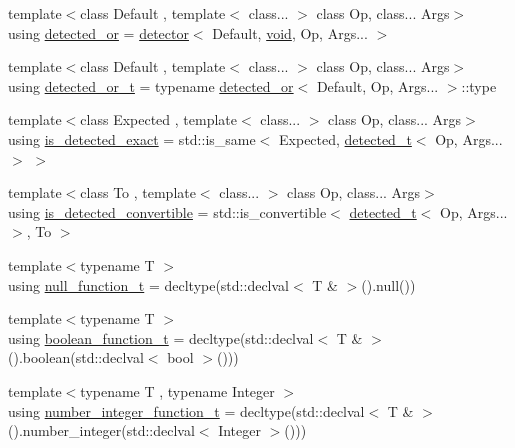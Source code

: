 \begin{DoxyCompactItemize}
\item 
{\footnotesize template$<$class Default , template$<$ class... $>$ class Op, class... Args$>$ }\\using \hyperlink{namespacenlohmann_1_1detail_a240ce21919ab08e8a6cb3a5cfa412bce}{detected\+\_\+or} = \hyperlink{structnlohmann_1_1detail_1_1detector}{detector}$<$ Default, \hyperlink{namespacenlohmann_1_1detail_a59fca69799f6b9e366710cb9043aa77d}{void}, Op, Args... $>$
\item 
{\footnotesize template$<$class Default , template$<$ class... $>$ class Op, class... Args$>$ }\\using \hyperlink{namespacenlohmann_1_1detail_a7ac5b8ef0363101275a2827b3b117dcf}{detected\+\_\+or\+\_\+t} = typename \hyperlink{namespacenlohmann_1_1detail_a240ce21919ab08e8a6cb3a5cfa412bce}{detected\+\_\+or}$<$ Default, Op, Args... $>$\+::type
\item 
{\footnotesize template$<$class Expected , template$<$ class... $>$ class Op, class... Args$>$ }\\using \hyperlink{namespacenlohmann_1_1detail_a7542b4dbac07817fd4849ecfa4619def}{is\+\_\+detected\+\_\+exact} = std\+::is\+\_\+same$<$ Expected, \hyperlink{namespacenlohmann_1_1detail_a37e97a32d0b94ce5f745427e4e40204d}{detected\+\_\+t}$<$ Op, Args... $>$ $>$
\item 
{\footnotesize template$<$class To , template$<$ class... $>$ class Op, class... Args$>$ }\\using \hyperlink{namespacenlohmann_1_1detail_a5262e531c46e357b33007060f294673b}{is\+\_\+detected\+\_\+convertible} = std\+::is\+\_\+convertible$<$ \hyperlink{namespacenlohmann_1_1detail_a37e97a32d0b94ce5f745427e4e40204d}{detected\+\_\+t}$<$ Op, Args... $>$, To $>$
\item 
{\footnotesize template$<$typename T $>$ }\\using \hyperlink{namespacenlohmann_1_1detail_ac1b4e524746bf8b790b2b776048b93c4}{null\+\_\+function\+\_\+t} = decltype(std\+::declval$<$ T \& $>$().null())
\item 
{\footnotesize template$<$typename T $>$ }\\using \hyperlink{namespacenlohmann_1_1detail_a45ec87326503b8884b664a9ef23a6c99}{boolean\+\_\+function\+\_\+t} = decltype(std\+::declval$<$ T \& $>$().boolean(std\+::declval$<$ bool $>$()))
\item 
{\footnotesize template$<$typename T , typename Integer $>$ }\\using \hyperlink{namespacenlohmann_1_1detail_a4a3e14a011b9ea1ff849fc6d2411e6a0}{number\+\_\+integer\+\_\+function\+\_\+t} = decltype(std\+::declval$<$ T \& $>$().number\+\_\+integer(std\+::declval$<$ Integer $>$()))

\end{DoxyCompactItemize}
